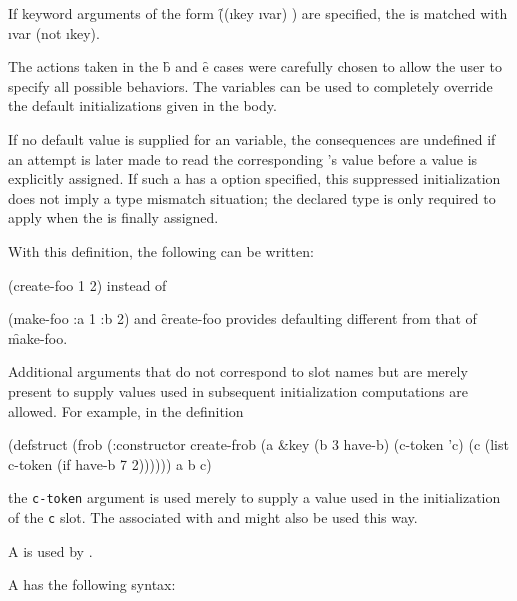 If keyword arguments of the form 
\f{((\i{key} \i{var}) )}
are specified, the   is matched with \i{var} 
(not \i{key}).

The actions taken in the \f{b} and \f{e} cases were carefully
chosen to allow the user to specify all possible behaviors. 
The  variables can be used to completely override the default
initializations given in the body.

If no default value is supplied for an  variable,
the consequences are undefined if an attempt is later made to read
the corresponding 's value before a value is explicitly assigned.
If such a  has a  option specified,
this suppressed initialization does not imply a type mismatch situation;
the declared type is only required to apply when the  is finally assigned.

With this definition, the following can be written:

\code
 (create-foo 1 2)
\endcode
instead of

\code
 (make-foo :a 1 :b 2)
\endcode
and \f{create-foo} provides defaulting different
from that of \f{make-foo}.

Additional arguments that do not correspond to slot names but
are merely present to supply values used in subsequent initialization 
computations are allowed.
For example, in the definition

\code
 (defstruct (frob (:constructor create-frob
                  (a &key (b 3 have-b) (c-token 'c) 
                          (c (list c-token (if have-b 7 2))))))
         a b c)
\endcode
 
the {\tt c-token} argument is used merely to supply a value used in the 
initialization of the {\tt c} slot. The  
associated with  and 
might also be used this way.
 

\endsubsection%


A  is used by .

A  has the following syntax:

